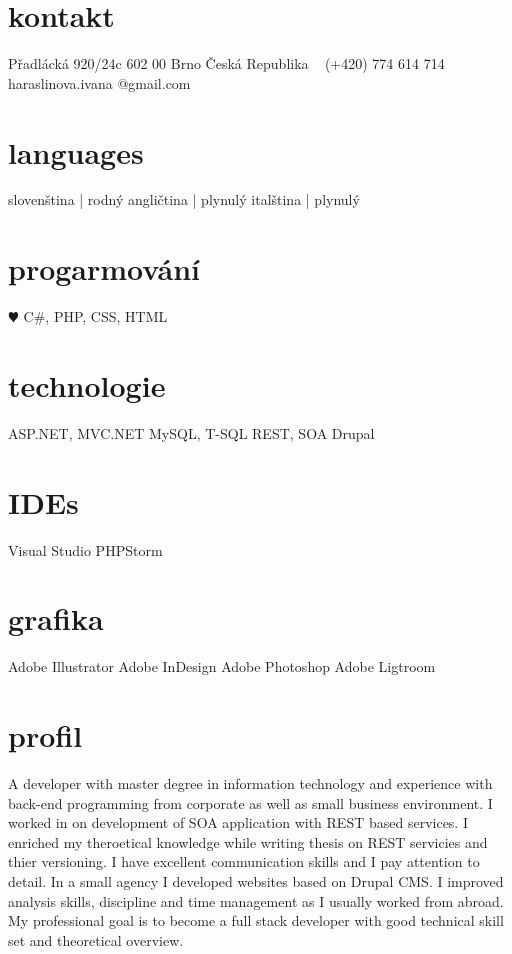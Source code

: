 \documentclass[]{friggeri-cv} %
\begin{document}


\begin{aside} %
\section{kontakt}
Přadlácká 920/24c
602 00 Brno
Česká Republika
~
(+420) 774 614 714
~
haraslinova.ivana
@gmail.com
\section{languages}
slovenština | rodný
angličtina | plynulý
italština | plynulý
\section{progarmování}
{\color{red} $\varheartsuit$} C\#, PHP, CSS, HTML
\section{technologie}
ASP.NET, MVC.NET 
MySQL, T-SQL
REST, SOA
Drupal
\section{IDEs}
Visual Studio
PHPStorm
\section{grafika}
Adobe Illustrator
Adobe InDesign
Adobe Photoshop
Adobe Ligtroom
\end{aside}


\section{profil}
A developer with master degree in information technology and experience with back-end programming from corporate as well as small business environment. 
I worked in on development of SOA application with REST based services. I enriched my theroetical knowledge while writing thesis on REST servicies and thier versioning. I have excellent communication skills and I pay attention to detail. In a small agency I developed websites based on Drupal CMS. I improved analysis skills, discipline and time management as I usually worked from abroad. My professional goal is to become a full stack developer with good technical skill set and theoretical overview.
\end{document}
